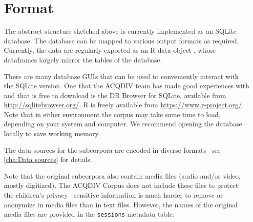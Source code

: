 \documentclass[a4paper, 11pt]{book}
\begin{document}
%


\section{Format}
\label{sec:Format}

The abstract structure sketched above is currently implemented as an SQLite database. The database can be mapped to various output formats as required. Currently, the data are regularly exported as an R data object \citep{RCoreTeam2015}, whose dataframes largely mirror the tables of the database. 

There are many database GUIs that can be used to conveniently interact with the SQLite version. One that the ACQDIV team has made good experiences with and that is free to download is the DB Browser for SQLite, available from \url{http://sqlitebrowser.org/}. R is freely available from \url{https://www.r-project.org/}. Note that in either environment the corpus may take some time to load, depending on your system and computer. We recommend opening the database locally to save working memory. 

The data sources for the subcorpora are encoded in diverse formats \textendash\ see \autoref{cha:Data sources} for details. 

Note that the original subcorpora also contain media files (audio and/or video, mostly digitized). The ACQDIV Corpus does not include these files to protect the children’s privacy \textendash\ sensitive information is much harder to remove or anonymize in media files than in text files. However, the names of the original media files are provided in the \texttt{sessions} metadata table. 
\end{document}
